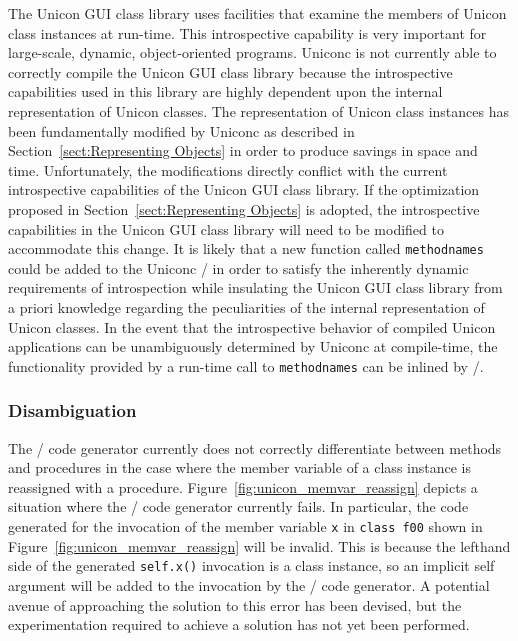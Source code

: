 The Unicon GUI class library uses facilities that examine the members
of Unicon class instances at \mbox{run-time}. This introspective
capability is very important for large-scale, dynamic, object-oriented
programs. Uniconc is not currently able to correctly compile the
Unicon GUI class library because the introspective capabilities used
in this library are highly dependent upon the internal representation
of Unicon classes. The representation of Unicon class instances has
been fundamentally modified by Uniconc as described in
Section~\ref{sect:Representing Objects} in order to produce savings in
space and time. Unfortunately, the modifications directly conflict
with the current introspective capabilities of the Unicon GUI class
library. If the optimization proposed in
Section~\ref{sect:Representing Objects} is adopted, the introspective
capabilities in the Unicon GUI class library will need to be modified
to accommodate this change. It is likely that a new function called
\texttt{methodnames} could be added to the Uniconc \Rtl/ in order to
satisfy the inherently dynamic requirements of introspection while
insulating the Unicon GUI class library from a priori knowledge
regarding the peculiarities of the internal representation of Unicon
classes. In the event that the introspective behavior of compiled
Unicon applications can be unambiguously determined by Uniconc at
\mbox{compile-time}, the functionality provided by a \mbox{run-time}
call to \texttt{methodnames} can be inlined by \Ic/.

\subsubsection{Disambiguation} 

The \Ic/ code generator currently does not correctly differentiate between
methods and procedures in the case where the member variable of a class instance
is reassigned with a procedure. Figure~\ref{fig:unicon_memvar_reassign} depicts
a situation where the \Ic/ code generator currently fails. In particular, the
code generated for the invocation of the member variable \texttt{x} in
\texttt{class f00} shown in Figure~\ref{fig:unicon_memvar_reassign} will be
invalid. This is because the lefthand side of the generated \texttt{self.x()}
invocation is a class instance, so an implicit self argument will be added to
the invocation by the \Ic/ code generator. A potential avenue of approaching
the solution to this error has been devised, but the experimentation required to
achieve a solution has not yet been performed.
 
